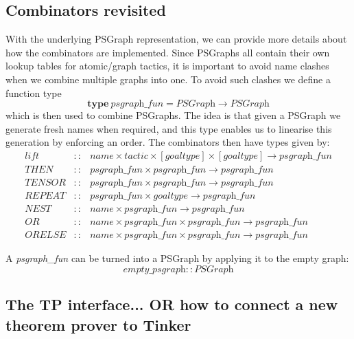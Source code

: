 \documentclass[submission,copyright,creativecommons]{eptcs}
\begin{document}
\subsection{Combinators revisited}

With the underlying PSGraph representation, we can provide more details about how the combinators are implemented. Since PSGraphs all contain their own lookup tables for atomic/graph tactics, it is important to avoid name clashes when we combine multiple graphs into one. To avoid such clashes we define a function type
$$
\textbf{type}~\textit{psgraph\_fun} = \textit{PSGraph} \rightarrow \textit{PSGraph}
$$
which is then used to combine PSGraphs. The idea is that given a PSGraph we generate fresh names when required, and this type enables us to linearise this generation by enforcing an order. The combinators then have types given by:
$$
\begin{array}{rcl}
\textit{lift} & :: & \textit{name} \times \textit{tactic} \times [\textit{goaltype}] \times [\textit{goaltype}] \rightarrow \textit{psgraph\_fun} \\
\textit{THEN} & :: & \textit{psgraph\_fun} \times \textit{psgraph\_fun} \rightarrow \textit{psgraph\_fun} \\
\textit{TENSOR} & :: & \textit{psgraph\_fun} \times \textit{psgraph\_fun} \rightarrow \textit{psgraph\_fun} \\
\textit{REPEAT} & :: & \textit{psgraph\_fun} \times \textit{goaltype} \rightarrow \textit{psgraph\_fun} \\
\textit{NEST} & :: & \textit{name} \times \textit{psgraph\_fun} \to  \textit{psgraph\_fun} \\
\textit{OR} & :: &  \textit{name} \times \textit{psgraph\_fun} \times \textit{psgraph\_fun} \rightarrow \textit{psgraph\_fun} \\
\textit{ORELSE} & :: &  \textit{name} \times \textit{psgraph\_fun} \times \textit{psgraph\_fun} \rightarrow \textit{psgraph\_fun}
\end{array}
$$

A \textit{psgraph\_fun} can be turned into a PSGraph by applying it to the empty graph:
$$
\textit{empty\_psgraph} :: \textit{PSGraph}
$$


\subsection{The TP interface... OR how to connect a new theorem prover to Tinker}
\end{document}
